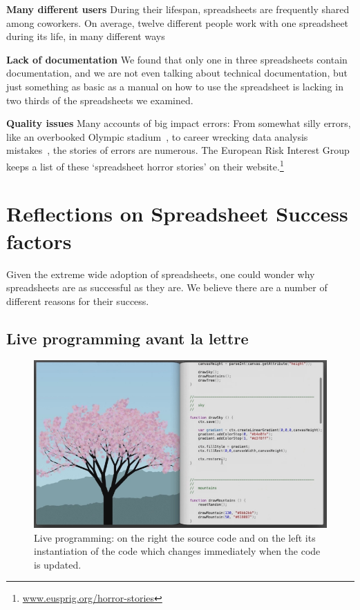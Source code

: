 \documentclass[conference]{IEEEtran}
\begin{document}
\textbf{Many different users} During their lifespan, spreadsheets are frequently shared among coworkers. On average, twelve different people work with one spreadsheet during its life, in many different ways 

\textbf{Lack of documentation} We found that only one in three spreadsheets contain documentation, and we are not even talking about technical documentation, but just something as basic as a manual on how to use the spreadsheet is lacking in two thirds of the spreadsheets we examined. 

\textbf{Quality issues} Many accounts of big impact errors: From somewhat silly errors, like an overbooked Olympic stadium~\cite{Kelso2012}, to career wrecking data analysis mistakes~\cite{Herndon2014}, the stories of errors are numerous. The European Risk Interest Group keeps a list of these ‘spreadsheet horror stories’ on their website.\footnote{\url{www.eusprig.org/horror-stories}}

\section{Reflections on Spreadsheet Success factors}
Given the extreme wide adoption of spreadsheets, one could wonder why spreadsheets are as successful as they are. We believe there are a number of different reasons for their success.

\subsection{Live programming avant la lettre}

\begin{figure}
  \begin{center}
  \includegraphics[width=\columnwidth]{fig/bret.png}
  \caption{Live programming: on the right the source code and on the left its instantiation of the code which changes immediately when the code is updated.}
  \label{fig:bret}
  \end{center}
\end{figure} 
\end{document}
